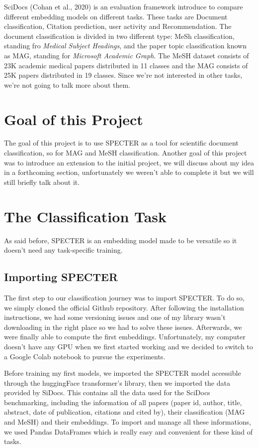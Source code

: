 \documentclass[conference]{IEEEtran}
\begin{document}
SciDocs (Cohan et al., 2020\cite{b1}) is an evaluation framework introduce to compare different embedding models on different tasks. These tasks are Document classification, Citation prediction, user activity and Recommendation. The document classification is divided in two different type: MeSh classification, standing fro \textit{Medical Subject Headings}, and the paper topic classification known as MAG, standing for \textit{Microsoft Academic Graph}. The MeSH dataset consists of 23K academic medical papers distributed in 11 classes and the MAG consists of 25K papers distributed in 19 classes.
Since we're not interested in other tasks, we're not going to talk more about them.

\section{Goal of this Project}

The goal of this project is to use SPECTER as a tool for scientific document classification, so for MAG and MeSH classification. Another goal of this project was to introduce an extension to the initial project, we will discuss about my idea in a forthcoming section, unfortunately we weren't able to complete it but we will still briefly talk about it.

\section{The Classification Task}

As said before, SPECTER is an embedding model made to be versatile so it doesn't need any task-specific training.

\subsection{Importing SPECTER}

The first step to our classification journey was to import SPECTER. To do so, we simply cloned the official Github repository. After following the installation instructions, we had some versioning issues and one of my library wasn't downloading in the right place so we had to solve these issues. Afterwards, we were finally able to compute the first embeddings. Unfortunately, my computer doesn't have any GPU when we first started working and we decided to switch to a Google Colab notebook to pursue the experiments.

Before training my first models, we imported the SPECTER model accessible through the huggingFace transformer's library, then we imported the data provided by SiDocs. This contains all the data used for the SciDocs benchmarking, including the information of all papers (paper id, author, title, abstract, date of publication, citations and cited by), their classification (MAG and MeSH) and their embeddings. To import and manage all these informations, we used Pandas DataFrames which is really easy and convenient for these kind of tasks.
\end{document}
